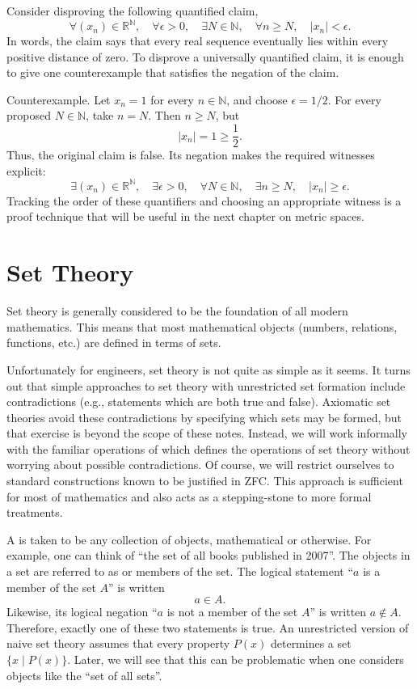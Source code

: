\begin{example}
Consider disproving the following quantified claim,
\[
\forall (x_n)\in\mathbb{R}^{\mathbb{N}},\quad
\forall \epsilon>0,\quad
\exists N\in\mathbb{N},\quad
\forall n\geq N,\quad |x_n|<\epsilon.
\]
In words, the claim says that every real sequence eventually lies within every positive distance of zero.
To disprove a universally quantified claim, it is enough to give one counterexample that satisfies the negation of the claim.

Counterexample.
Let $x_n=1$ for every $n\in\mathbb{N}$, and choose $\epsilon=1/2$.
For every proposed $N\in\mathbb{N}$, take $n=N$.
Then $n\geq N$, but
\[
|x_n|=1 \geq \frac12.
\]
Thus, the original claim is false.
Its negation makes the required witnesses explicit:
\[
\exists (x_n)\in\mathbb{R}^{\mathbb{N}},\quad
\exists \epsilon>0,\quad
\forall N\in\mathbb{N},\quad
\exists n\geq N,\quad |x_n|\geq\epsilon.
\]
Tracking the order of these quantifiers and choosing an appropriate witness is a proof technique that will be useful in the next chapter on metric spaces.
\end{example}


\section{Set Theory}\label{section:SetTheory}
Set theory is generally considered to be the foundation of all modern mathematics.
This means that most mathematical objects (numbers, relations, functions, etc.) are defined in terms of sets.

Unfortunately for engineers, set theory is not quite as simple as it seems.
It turns out that simple approaches to set theory with unrestricted set formation include contradictions (e.g., statements which are both true and false).
Axiomatic set theories avoid these contradictions by specifying which sets may be formed, but that exercise is beyond the scope of these notes.
Instead, we will work informally with the familiar operations of  which defines the operations of set theory without worrying about possible contradictions.
Of course, we will restrict ourselves to standard constructions known to be justified in ZFC.
This approach is sufficient for most of mathematics and also acts as a stepping-stone to more formal treatments.

A  is taken to be any collection of objects, mathematical or otherwise.
For example, one can think of ``the set of all books published in 2007''.
The objects in a set are referred to as  or members of the set.
The logical statement ``$a$ is a member of the set $A$'' is written
\[ a \in A. \]
Likewise, its logical negation ``$a$ is not a member of the set $A$'' is written $a \notin A$.
Therefore, exactly one of these two statements is true.
An unrestricted version of naive set theory assumes that every property $P(x)$ determines a set $\{x\mid P(x)\}$.
Later, we will see that this can be problematic when one considers objects like the ``set of all sets''.

